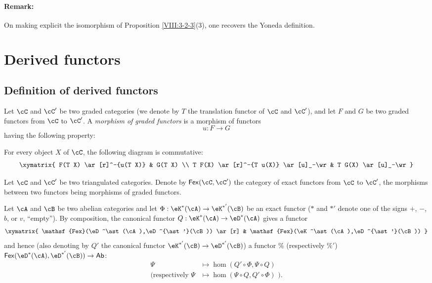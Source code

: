 \documentclass[oneside]{book}
\begin{document}
\paragraph{Remark:}
On making explicit the isomorphism of Proposition
\ref{VIII:3-2-3}(3), one recovers the Yoneda definition.

\section{Derived functors}\label{VIII:4}

\subsection{Definition of derived functors}\label{VIII:4-1}

\begin{definition}\label{VIII:4-1-1}
Let $\cC$ and $\cC'$ be two graded categories (we denote by $T$ the
translation functor of $\cC$ and $\cC'$), and let $F$ and $G$ be two
graded functors from $\cC$ to $\cC'$. A \emph{morphism of graded functors}
is a morphism of functors
\[
  u:F\to G
\]
having the following property:

For every object $X$ of $\cC$, the following diagram is commutative:
\[\xymatrix{
  F(T X) \ar[r]^-{u(T X)}
    & G(T X) \\
  T F(X) \ar[r]^-{T u(X)} \ar[u]_-\wr
    & T G(X) \ar[u]_-\wr
}\]
\end{definition}

Let $\cC$ and $\cC'$ be two triangulated categories. Denote by
$\mathsf{Fex}(\cC,\cC')$ the category of exact functors from $\cC$ to
$\cC'$, the morphisms between two functors being morphisms of graded
functors.

Let $\cA$ and $\cB$ be two abelian categories and let
$\Phi:\eK^\ast(\cA)\to \eK^{\ast'}(\cB)$ be an exact functor ($\ast$ and
$\ast'$ denote one of the signs $+$, $-$, $b$, or $v$, “empty”). By
composition, the canonical functor
$Q:\eK^\ast(\cA)\to \eD^\ast(\cA)$ gives a functor
\[\xymatrix{
  \mathsf{Fex}(\eD^\ast(\cA),\eD^{\ast'}(\cB)) \ar[r]
    & \mathsf{Fex}(\eK^\ast(\cA),\eD^{\ast'}(\cB))
}\]
and hence (also denoting by $Q'$ the canonical functor
$\eK^{\ast'}(\cB) \to \eD^{\ast'}(\cB)$) a functor $\%$
(respectively $\%'$)
$\mathsf{Fex}(\eD^\ast(\cA),\eD^{\ast'}(\cB)) \to \mathsf{Ab}$:
\begin{align*}
  \Psi  &\mapsto \hom(Q'\circ \Phi,\Psi\circ Q) \\
  (\text{respectively }\Psi &\mapsto \hom(\Psi\circ Q,Q'\circ \Phi)\text{ ).}
\end{align*}
\end{document}
